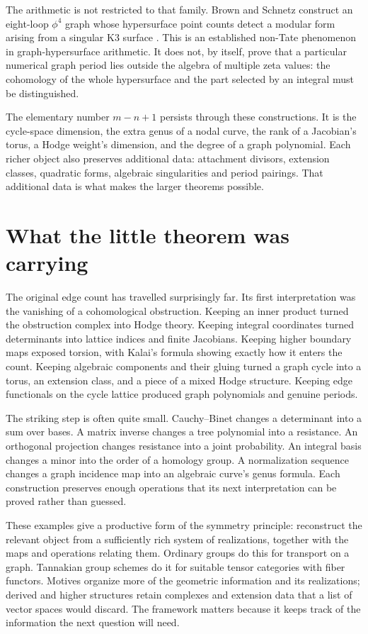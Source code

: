 \documentclass[11pt]{article}
\theoremstyle{definition}
\theoremstyle{remark}
\begin{document}
The arithmetic is not restricted to that family.  Brown and Schnetz
construct an eight-loop $\phi^4$ graph whose hypersurface point counts
detect a modular form arising from a singular K3 surface
\cite{BrownSchnetzKThree}.  This is an established non-Tate phenomenon
in graph-hypersurface arithmetic.  It does not, by itself, prove that a
particular numerical graph period lies outside the algebra of multiple
zeta values: the cohomology of the whole hypersurface and the part
selected by an integral must be distinguished.

The elementary number $m-n+1$ persists through these constructions.  It
is the cycle-space dimension, the extra genus of a nodal curve, the rank
of a Jacobian's torus, a Hodge weight's dimension, and the degree of a
graph polynomial.  Each richer object also preserves additional data:
attachment divisors, extension classes, quadratic forms, algebraic
singularities and period pairings.  That additional data is what makes
the larger theorems possible.


\section{What the little theorem was carrying}
\label{sec:conclusion}

The original edge count has travelled surprisingly far. Its first interpretation was the vanishing of a cohomological obstruction. Keeping an inner product turned the obstruction complex into Hodge theory. Keeping integral coordinates turned determinants into lattice indices and finite Jacobians. Keeping higher boundary maps exposed torsion, with Kalai's formula showing exactly how it enters the count. Keeping algebraic components and their gluing turned a graph cycle into a torus, an extension class, and a piece of a mixed Hodge structure. Keeping edge functionals on the cycle lattice produced graph polynomials and genuine periods.

The striking step is often quite small. Cauchy--Binet changes a determinant into a sum over bases. A matrix inverse changes a tree polynomial into a resistance. An orthogonal projection changes resistance into a joint probability. An integral basis changes a minor into the order of a homology group. A normalization sequence changes a graph incidence map into an algebraic curve's genus formula. Each construction preserves enough operations that its next interpretation can be proved rather than guessed.

These examples give a productive form of the symmetry principle: reconstruct the relevant object from a sufficiently rich system of realizations, together with the maps and operations relating them. Ordinary groups do this for transport on a graph. Tannakian group schemes do it for suitable tensor categories with fiber functors. Motives organize more of the geometric information and its realizations; derived and higher structures retain complexes and extension data that a list of vector spaces would discard. The framework matters because it keeps track of the information the next question will need.
\end{document}
